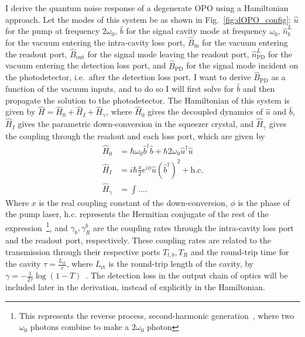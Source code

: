 I derive the quantum noise response of a degenerate OPO using a Hamiltonian approach. Let the modes of this system be as shown in Fig.~\ref{fig:dOPO_config}: $\hat u$ for the pump at frequency $2\omega_0$, $\hat b$ for the signal cavity mode at frequency $\omega_0$, $\hat n^L_b$ for the vacuum entering the intra-cavity loss port, $\hat B_\text{in}$ for the vacuum entering the readout port, $\hat B_\text{out}$ for the signal mode leaving the readout port, $\hat n^L_\text{PD}$ for the vacuum entering the detection loss port, and $\hat B_\text{PD}$ for the signal mode incident on the photodetector, i.e.\ after the detection loss port. I want to derive $\hat B_\text{PD}$ as a function of the vacuum inputs, and to do so I will first solve for $\hat b$ and then propagate the solution to the photodetector. 
The Hamiltonian of this system is given by $\hat H = \hat H_0 + \hat H_I + \hat H_\gamma$, where $\hat H_0$ gives the decoupled dynamics of $\hat u$ and $\hat b$, $\hat H_I$ gives the parametric down-conversion in the squeezer crystal, and $\hat H_\gamma$ gives the coupling through the readout and each loss port, which are given by~\cite{} 
\begin{align}
\hat H_0 &= \hbar \omega_0 \hat b^\dag \hat b + \hbar 2 \omega_0 \hat u^\dag \hat u\\
\hat H_I &= i \hbar \frac{x}{2} e^{i\phi} \hat u (\hat b^\dag)^2 + \text{h.c.}\\
\hat H_\gamma &= \int \ldots .
\end{align}
Where $x$ is the real coupling constant of the down-conversion, $\phi$ is the phase of the pump laser, $\text{h.c.}$ represents the Hermitian conjugate of the rest of the expression~\footnote{This represents the reverse process, second-harmonic generation~\cite{}, where two $\omega_0$ photons combine to make a $2\omega_0$ photon}, and $\gamma_b, \gamma^b_R$ are the coupling rates through the intra-cavity loss port and the readout port, respectively. These coupling rates are related to the transmission through their respective ports $T_{l,b}, T_R$ and the round-trip time for the cavity $\tau = \frac{L_\text{rt}}{c}$, where $L_\text{rt}$ is the round-trip length of the cavity, by $\gamma = -\frac{1}{2\tau}\log(1-T)$~\cite{}. The detection loss in the output chain of optics will be included later in the derivation, instead of explicitly in the Hamiltonian. 


